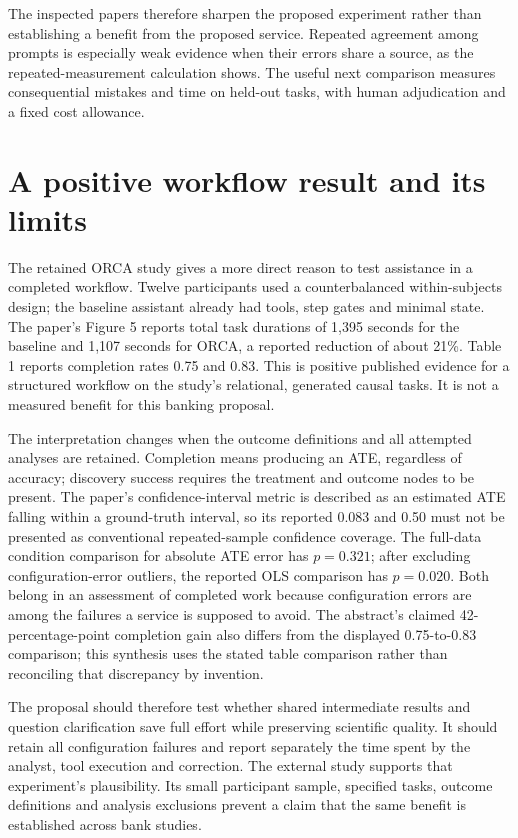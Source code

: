 The inspected papers therefore sharpen the proposed experiment rather
than establishing a benefit from the proposed service. Repeated agreement
among prompts is especially weak evidence when their errors share a source,
as the repeated-measurement calculation shows. The useful next comparison
measures consequential mistakes and time on held-out tasks, with human
adjudication and a fixed cost allowance.




\section{A positive workflow result and its limits}
The retained ORCA study gives a more direct reason to test assistance in a
completed workflow. Twelve participants used a counterbalanced within-subjects
design; the baseline assistant already had tools, step gates and minimal
state. The paper's Figure 5 reports total task durations of 1,395 seconds
for the baseline and 1,107 seconds for ORCA, a reported reduction of about
21\%. Table 1 reports completion rates 0.75 and 0.83. This is positive
published evidence for a structured workflow on the study's relational,
generated causal tasks. It is not a measured benefit for this banking
proposal. \citep[pp.~3--5]{exec13_census_orca}

The interpretation changes when the outcome definitions and all attempted
analyses are retained. Completion means producing an ATE, regardless of
accuracy; discovery success requires the treatment and outcome nodes to be
present. The paper's confidence-interval metric is described as an estimated
ATE falling within a ground-truth interval, so its reported 0.083 and 0.50
must not be presented as conventional repeated-sample confidence coverage.
The full-data condition comparison for absolute ATE error has $p=0.321$;
after excluding configuration-error outliers, the reported OLS comparison
has $p=0.020$. Both belong in an assessment of completed work because
configuration errors are among the failures a service is supposed to avoid.
The abstract's claimed 42-percentage-point completion gain also differs
from the displayed 0.75-to-0.83 comparison; this synthesis uses the stated
table comparison rather than reconciling that discrepancy by invention.
\citep[pp.~1, 5, 17--18]{exec13_census_orca}

The proposal should therefore test whether shared intermediate results and
question clarification save full effort while preserving scientific quality.
It should retain all configuration failures and report separately the time
spent by the analyst, tool execution and correction. The external study
supports that experiment's plausibility. Its small participant sample,
specified tasks, outcome definitions and analysis exclusions prevent a
claim that the same benefit is established across bank studies.

